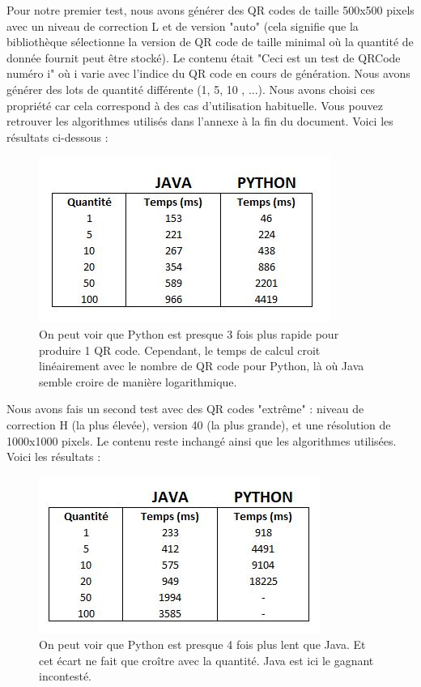 \documentclass[a4paper,12pt]{article}
\begin{document}
\begin{itemize}
  Pour notre premier test, nous avons générer des QR codes de taille 500x500 pixels avec un niveau de correction L et de version "auto" (cela signifie que la bibliothèque sélectionne la version de QR code de taille minimal où la quantité de donnée fournit peut être stocké). Le contenu était "Ceci est un test de QRCode numéro i" où i varie avec l'indice du QR code en cours de génération. Nous avons générer des lots de quantité différente (1, 5, 10 , ...). Nous avons choisi ces propriété car cela correspond à des cas d'utilisation habituelle. Vous pouvez retrouver les algorithmes utilisés dans l'annexe à la fin du document. Voici les résultats ci-dessous :

    \begin{figure}[H]
        \centering
        \includegraphics[width=.5\textwidth]{vitesse small.JPG}
        \caption{On peut voir que Python est presque 3 fois plus rapide pour produire 1 QR code. Cependant, le temps de calcul croit linéairement avec le nombre de QR code pour Python, là où Java semble croire de manière logarithmique.}
    \end{figure}
 
  Nous avons fais un second test avec des QR codes "extrême" : niveau de correction H (la plus élevée), version 40 (la plus grande), et une résolution de 1000x1000 pixels. Le contenu reste inchangé ainsi que les algorithmes utilisées. Voici les résultats : 
  
  
      \begin{figure}[H]
        \centering
        \includegraphics[width=.5\textwidth]{vitesse big.JPG}
        \caption{On peut voir que Python est presque 4 fois plus lent que Java. Et cet écart ne fait que croître avec la quantité. Java est ici le gagnant incontesté.}
    \end{figure}


\end{itemize}
\end{document}
